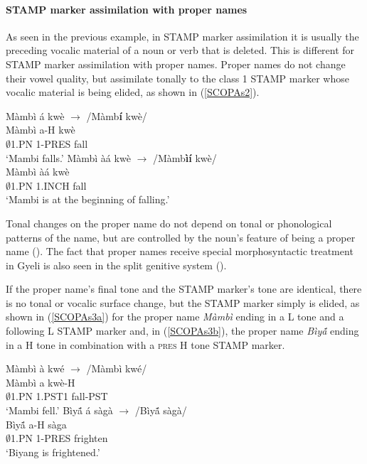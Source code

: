 \paragraph{STAMP marker assimilation with proper names}
As seen in the previous example, in STAMP marker assimilation it is usually the preceding vocalic material of a noun or verb that is deleted. This is different for STAMP marker assimilation with proper names. Proper names do not change their vowel quality, but assimilate tonally to the class 1 STAMP marker whose vocalic material is being elided, as shown in (\ref{SCOPAs2}). 

\begin{exe}
\ex\label{SCOPAs2}
\begin{xlist}
\ex\label{SCOPAs2a}
\glll Màmbì á kwè   $\rightarrow$ /Màmb{\bfseries í} kwè/ \\ 
      Màmbì a-H kwè \\
	$\emptyset$1.PN 1-PRES fall\\
	\trans `Mambi falls.'
\ex \label{SCOPAs2b}
  \glll Màmbì àá kwè  $\rightarrow$ /Màmb{\bfseries ìí} kwè/ \\
        Màmbì àá kwè \\
          $\emptyset$1.PN 1.INCH fall    \\
    \trans `Mambi is at the beginning of falling.'
\end{xlist}
\end{exe}

Tonal changes on the proper name do not depend on tonal or phonological patterns of the name, but are controlled by the noun's feature of being a proper name ().  The fact that proper names receive special morphosyntactic treatment in Gyeli is also seen in the split genitive system (). 

If the proper name's final tone and the STAMP marker's tone are identical, there is no tonal or vocalic surface change, but the STAMP marker simply is elided, as shown in (\ref{SCOPAs3a}) for  the proper name {\itshape Màmbì} ending in a L tone and a following L STAMP marker and, in (\ref{SCOPAs3b}), the proper name {\itshape Bìyã́} ending in a H tone in combination with a \textsc{pres} H tone STAMP marker.


\begin{exe}
\ex\label{SCOPAs3}
\begin{xlist}
\ex \label{SCOPAs3a}
   \glll   Màmbì à kwé   $\rightarrow$ /Màmbì kwé/ \\
          Màmbì a kwè-H \\
            $\emptyset$1.PN 1.PST1 fall-PST  \\
    \trans `Mambi fell.'
\ex\label{SCOPAs3b}
\glll  Bìyã́ á sàgà $\rightarrow$ /Bìyã́ sàgà/ \\
       Bìyã́ a-H sàga \\
           $\emptyset$1.PN 1-PRES frighten    \\
    \trans `Biyang is frightened.'
 \end{xlist}
\end{exe}

